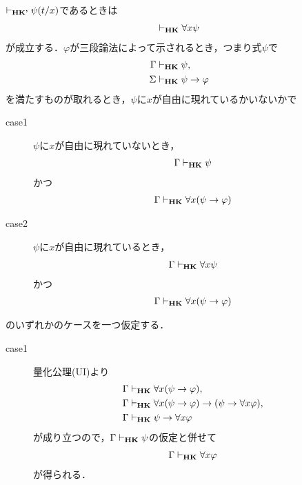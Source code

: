 	\begin{sketch}
		$\vdash_{{\scriptsize \mbox{{\bf HK'}}}} \psi(t/x)$であるときは
		\begin{align}
			\vdash_{{\scriptsize \mbox{{\bf HK}}}} \forall x \psi
		\end{align}
		が成立する．$\varphi$が三段論法によって示されるとき，つまり式$\psi$で
		\begin{align}
			\Gamma &\vdash_{{\scriptsize \mbox{{\bf HK}}}} \psi, \\
			\Sigma &\vdash_{{\scriptsize \mbox{{\bf HK}}}} \psi \rightarrow \varphi
		\end{align}
		を満たすものが取れるとき，$\psi$に$x$が自由に現れているかいないかで
		\begin{description}
			\item[case1] $\psi$に$x$が自由に現れていないとき，
				\begin{align}
					\Gamma \vdash_{{\scriptsize \mbox{{\bf HK}}}} \psi
				\end{align}
				かつ
				\begin{align}
					\Gamma \vdash_{{\scriptsize \mbox{{\bf HK}}}} \forall x (\psi \rightarrow \varphi)
				\end{align}
				
			\item[case2] $\psi$に$x$が自由に現れているとき，
				\begin{align}
					\Gamma \vdash_{{\scriptsize \mbox{{\bf HK}}}} \forall x \psi
				\end{align}
				かつ
				\begin{align}
					\Gamma \vdash_{{\scriptsize \mbox{{\bf HK}}}} \forall x (\psi \rightarrow \varphi)
				\end{align}
		\end{description}
		のいずれかのケースを一つ仮定する．
		\begin{description}
			\item[case1] 量化公理(UI)より
				\begin{align}
					\Gamma &\vdash_{{\scriptsize \mbox{{\bf HK}}}} \forall x (\psi \rightarrow \varphi), \\
					\Gamma &\vdash_{{\scriptsize \mbox{{\bf HK}}}} \forall x (\psi \rightarrow \varphi) \rightarrow (\psi \rightarrow \forall x \varphi), \\
					\Gamma &\vdash_{{\scriptsize \mbox{{\bf HK}}}} \psi \rightarrow \forall x \varphi
				\end{align}
				が成り立つので，$\Gamma \vdash_{{\scriptsize \mbox{{\bf HK}}}} \psi$の仮定と併せて
				\begin{align}
					\Gamma \vdash_{{\scriptsize \mbox{{\bf HK}}}} \forall x \varphi
				\end{align}
				が得られる．
				

\end{description}
\end{sketch}

